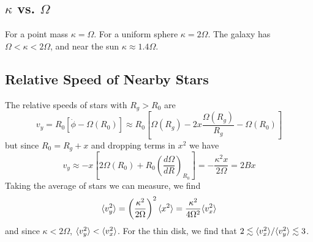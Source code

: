 \documentclass[]{article}
\begin{document}
\subsection{$\kappa$ vs. $\Omega$}

For a point mass $\kappa = \Omega$.  For a uniform sphere $\kappa = 2\Omega$.
The galaxy has $\Omega < \kappa < 2\Omega$, and near the sun $\kappa \approx 1.4 \Omega$.

\subsection{Relative Speed of Nearby Stars}

The relative speeds of stars with $R_g > R_0$ are
\begin{equation}
v_y = R_0[\dot{\phi} - \Omega(R_0)]\approx R_0 \left[ \Omega(R_g) - 2x \frac{\Omega(R_g)}{R_g} - \Omega(R_0)\right]
\end{equation}
\noindent
but since $R_0 = R_g + x$ and dropping terms in $x^2$ we have
\begin{equation}
v_y \approx -x\left[ 2\Omega(R_0) + R_0\left(\frac{d\Omega}{dR}\right)_{R_0}\right] = -\frac{\kappa^2 x}{2\Omega} = 2Bx
\end{equation}
\noindent
Taking the average of stars we can measure, we find
\begin{equation}
\langle v_y^2\rangle = \left(\frac{\kappa^2}{2\Omega}\right)^2\langle x^2\rangle = \frac{\kappa^2}{4\Omega^2}\langle v_x^2\rangle
\end{equation}
\noindent
and since $\kappa<2\Omega$, $\langle v_y^2\rangle<\langle v_x^2\rangle$.  For the thin disk, we find that $2\lesssim\langle v_x^2\rangle/\langle v_y^2\rangle\lesssim3$.
\end{document}
